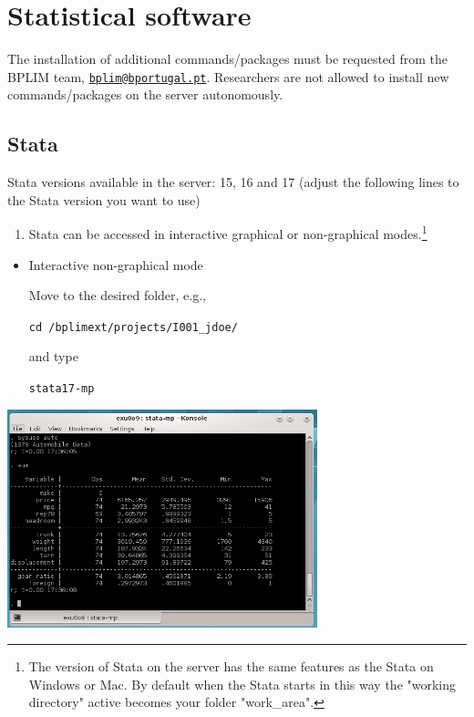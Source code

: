 \documentclass[
  11pt,
  a4paper,
]{article}
\providecommand{\tightlist}{%
  \setlength{\itemsep}{0pt}\setlength{\parskip}{0pt}}
\begin{document}
\hypertarget{statistical_software}{%
\section{Statistical software}\label{statistical_software}}

The installation of additional commands/packages must be requested from
the BPLIM team,
\href{mailto:bplim@bportugal.pt}{\nolinkurl{bplim@bportugal.pt}}.
Researchers are not allowed to install new commands/packages on the
server autonomously.

\hypertarget{stata}{%
\subsection{Stata}\label{stata}}

Stata versions available in the server: 15, 16 and 17 (adjust the
following lines to the Stata version you want to use)

\begin{enumerate}
\def\labelenumi{\arabic{enumi}.}
\tightlist
\item
  Stata can be accessed in interactive graphical or non-graphical
  modes.\footnote{The version of Stata on the server has the same
    features as the Stata on Windows or Mac. By default when the Stata
    starts in this way the "working directory" active becomes your
    folder "work\_area".}
\end{enumerate}

\begin{itemize}
\item
  Interactive non-graphical mode

  Move to the desired folder, e.g.,

  \texttt{cd\ /bplimext/projects/I001\_jdoe/}

  and type

  \texttt{stata17-mp}
\end{itemize}

\includegraphics[width=3.54331in,height=2.4886in]{./media/image10.png}
\end{document}
